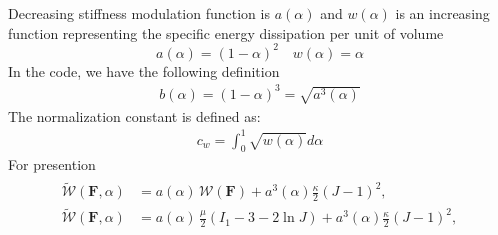 \documentclass[12pt,3p]{article}
\numberwithin{equation}{section}
\begin{document}
Decreasing stiffness modulation function is $a (\alpha)$ and $w(\alpha)$ is an increasing function representing the specific energy dissipation per unit of volume
\begin{equation}\label{EqStiffMod}
a (\alpha) = (1 - \alpha)^2 \quad w(\alpha) = \alpha
\end{equation}
In the code, we have the following definition
\begin{align*}
b (\alpha) = (1 - \alpha)^3 = \sqrt{a^3(\alpha)}
\end{align*}
The normalization constant is defined as: 
\begin{align}\label{NormConst} %
c_w=\int_0^1\sqrt{w(\alpha)}d\alpha
\end{align} 
For presention
\begin{align}\label{PF_strain_energy1}
\begin{split}
\widetilde{\mathcal{W}}(\mathbf{F},\alpha) &= a(\alpha) \, \mathcal{W}(\mathbf{F}) + a^3(\alpha)\frac{\kappa}{2} \left(J-1\right)^2, \\
\widetilde{\mathcal{W}}(\mathbf{F},\alpha) &= a(\alpha) \, \frac{\mu}{2} (I_1 - 3 - 2 \ln J) + a^3(\alpha)\frac{\kappa}{2}\left(J-1\right)^2, 
\end{split}
\end{align}
\end{document}

